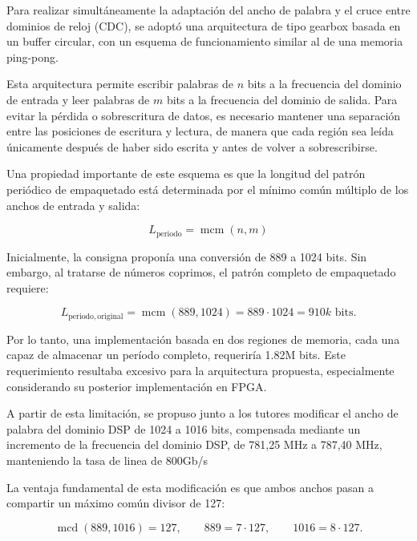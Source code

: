 \documentclass[10pt,a4paper]{article}
\begin{document}
Para realizar simultáneamente la adaptación del ancho de palabra y el
cruce entre dominios de reloj (CDC), se adoptó una arquitectura de
tipo gearbox basada en un buffer circular, con un esquema de
funcionamiento similar al de una memoria ping-pong.

Esta arquitectura permite escribir palabras de $n$ bits a la frecuencia
del dominio de entrada y leer palabras de $m$ bits a la frecuencia del
dominio de salida. Para evitar la pérdida o sobrescritura de datos, es
necesario mantener una separación entre las posiciones de escritura y
lectura, de manera que cada región sea leída únicamente después de
haber sido escrita y antes de volver a sobrescribirse.

Una propiedad importante de este esquema es que la longitud del
patrón periódico de empaquetado está determinada por el mínimo
común múltiplo de los anchos de entrada y salida:

\begin{equation}
    L_{\mathrm{periodo}}
    =
    \operatorname{mcm}(n,m)
\end{equation}

Inicialmente, la consigna proponía una conversión de 889 a 1024 bits.
Sin embargo, al tratarse de números coprimos, el patrón completo
de empaquetado requiere:

\begin{equation}
    L_{\mathrm{periodo,original}}
    =
    \operatorname{mcm}(889,1024)
    =
    889 \cdot 1024
    =
    910k\text{ bits}.
\end{equation}

Por lo tanto, una implementación basada en dos regiones de memoria,
cada una capaz de almacenar un período completo, requeriría
1.82M bits. Este requerimiento resultaba excesivo para la
arquitectura propuesta, especialmente considerando su posterior
implementación en FPGA.

A partir de esta limitación, se propuso junto a los tutores modificar
el ancho de palabra del dominio DSP de 1024 a 1016 bits, compensada 
mediante un incremento de la frecuencia del dominio DSP, de 781,25 
MHz a 787,40 MHz, manteniendo la tasa de linea de 800Gb/s

La ventaja fundamental de esta modificación es que ambos anchos
pasan a compartir un máximo común divisor de 127:

\begin{equation}
    \operatorname{mcd}(889,1016)=127,
    \qquad
    889=7\cdot127,
    \qquad
    1016=8\cdot127.
\end{equation}
\end{document}
